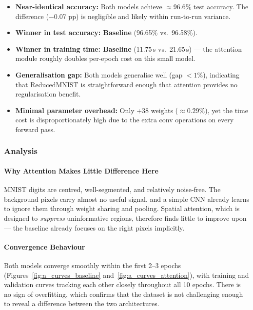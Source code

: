 \begin{itemize}[leftmargin=1.5em]
    \item \textbf{Near-identical accuracy:} Both models achieve $\approx$96.6\%
	    test accuracy. The difference ($-$0.07 pp) is negligible and likely within
	    run-to-run variance.
    \item \textbf{Winner in test accuracy: Baseline} (96.65\% vs.\ 96.58\%).
    \item \textbf{Winner in training time: Baseline} (11.75\,s vs.\ 21.65\,s) ---
	    the attention module roughly doubles per-epoch cost on this small model.
    \item \textbf{Generalisation gap:} Both models generalise well (gap $<1\%$),
	    indicating that ReducedMNIST is straightforward enough that attention
	    provides no regularisation benefit.
    \item \textbf{Minimal parameter overhead:} Only +38 weights ($\approx0.29\%$),
	    yet the time cost is disproportionately high due to the extra conv operations
	    on every forward pass.
\end{itemize}

\subsubsection{Analysis}

\paragraph{Why Attention Makes Little Difference Here}

MNIST digits are centred, well-segmented, and relatively noise-free. The background
pixels carry almost no useful signal, and a simple CNN already learns to ignore them
through weight sharing and pooling. Spatial attention, which is designed to
\emph{suppress} uninformative regions, therefore finds little to improve upon ---
the baseline already focuses on the right pixels implicitly.

\paragraph{Convergence Behaviour}

Both models converge smoothly within the first 2--3 epochs
(Figures~\ref{fig:a_curves_baseline} and~\ref{fig:a_curves_attention}), with training
and validation curves tracking each other closely throughout all 10 epochs. There is
no sign of overfitting, which confirms that the dataset is not challenging enough to
reveal a difference between the two architectures.

